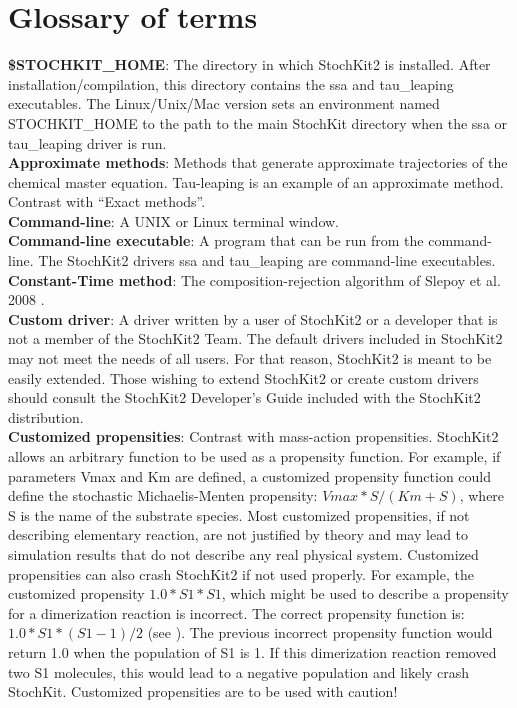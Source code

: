 \documentclass[11pt,letterpaper]{article}
\begin{document}
\clearpage
\section{Glossary of terms}

\textbf{\$STOCHKIT\_HOME}: The directory in which StochKit2 is installed.  After installation/compilation, this directory contains the ssa and tau\_leaping executables.  The Linux/Unix/Mac version sets an environment named STOCHKIT\_HOME to the path to the main StochKit directory when the ssa or tau\_leaping driver is run.
\\\textbf{Approximate methods}: Methods that generate approximate trajectories of the chemical master equation.  Tau-leaping is an example of an approximate method.  Contrast with “Exact methods”.
\\\textbf{Command-line}: A UNIX or Linux terminal window.
\\\textbf{Command-line executable}: A program that can be run from the command-line.  The StochKit2 drivers ssa and tau\_leaping are command-line executables.
\\\textbf{Constant-Time method}: The composition-rejection algorithm of Slepoy et al. 2008 \cite{Slepoy2008}.
\\\textbf{Custom driver}: A driver written by a user of StochKit2 or a developer that is not a member of the StochKit2 Team.  The default drivers included in StochKit2 may not meet the needs of all users.  For that reason, StochKit2 is meant to be easily extended.  Those wishing to extend StochKit2 or create custom drivers should consult the StochKit2 Developer's Guide included with the StochKit2 distribution.
\\\textbf{Customized propensities}: Contrast with mass-action propensities.  StochKit2 allows an arbitrary function to be used as a propensity function.  For example, if parameters Vmax and Km are defined, a customized propensity function could define the stochastic Michaelis-Menten propensity: $Vmax*S/(Km+S)$, where S is the name of the substrate species.  Most customized propensities, if not describing elementary reaction, are not justified by theory and may lead to simulation results that do not describe any real physical system.  Customized propensities can also crash StochKit2 if not used properly.  For example, the customized propensity $1.0*S1*S1$, which might be used to describe a propensity for a dimerization reaction is incorrect.  The correct propensity function is: $1.0*S1*(S1-1)/2$ (see \cite{Gillespie1977}).  The previous incorrect propensity function would return 1.0 when the population of S1 is 1.  If this dimerization reaction removed two S1 molecules, this would lead to a negative population and likely crash StochKit.  Customized propensities are to be used with caution!
\end{document}
